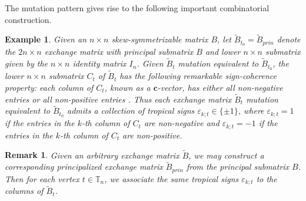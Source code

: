 \documentclass{amsart}
\newtheorem{remark}[theorem]{Remark}
\newtheorem{example}[theorem]{Example}
\newcommand{\bfc}{\mathbf{c}}
\newcommand{\bfx}{\mathbf{x}}
\newcommand{\TT}{\mathbb{T}}
\begin{document}
The mutation pattern gives rise to the following important combinatorial construction.
\begin{example}
  Given an $n\times n$ skew-symmetrizable matrix $B$, let $\tilde B_{t_0}=\tilde B_{prin}$ denote the $2n\times n$ exchange matrix with principal submatrix $B$ and lower $n\times n$ submatrix given by the $n\times n$ identity matrix $I_n$.
  Given $\tilde B_t$ mutation equivalent to $\tilde B_{t_0}$, the lower $n\times n$ submatrix $C_t$ of $\tilde B_t$ has the following remarkable \emph{sign-coherence} property: each column of $C_t$, known as a $\bfc$-vector, has either all non-negative entries or all non-positive entries \cite{fomin-zelevinsky4,nakanishi-zelevinsky,gross-hacking-keel-kontsevich}.
  Thus each exchange matrix $\tilde B_t$ mutation equivalent to $\tilde B_{t_0}$ admits a collection of \emph{tropical signs} $\varepsilon_{k;t}\in\{\pm1\}$, where $\varepsilon_{k;t}=1$ if the entries in the $k$-th column of $C_t$ are non-negative and $\varepsilon_{k;t}=-1$ if the entries in the $k$-th column of $C_t$ are non-positive. 
\end{example}

\begin{remark}
  Given an arbitrary exchange matrix $\tilde B$, we may construct a corresponding principalized exchange matrix $\tilde B_{prin}$ from the principal submatrix $B$.
  Then for each vertex $t\in\TT_n$, we associate the same tropical signs $\varepsilon_{k;t}$ to the columns of $\tilde B_t$.
\end{remark}
\end{document}

